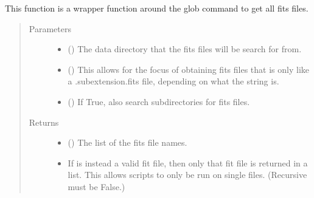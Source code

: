 \documentclass[letterpaper,10pt,english]{sphinxmanual}
\begin{document}
\begin{fulllineitems}
\label{\detokenize{docstrings/ifa_smeargle.core.io:ifa_smeargle.core.io.get_fits_filenames}}
This function is a wrapper function around the glob command
to get all fits files.
\begin{quote}\begin{description}
\item[{Parameters}] \leavevmode\begin{itemize}
\item {} 
 () \textendash{} The data directory that the fits files will be search for
from.

\item {} 
 (\sphinxstyleliteralemphasis{\sphinxupquote{ (}}\sphinxstyleliteralemphasis{\sphinxupquote{)}}) \textendash{} This allows for the focus of obtaining fits files that
is only like a .subextension.fits file, depending on what
the string  is.

\item {} 
 (\sphinxstyleliteralemphasis{\sphinxupquote{ (}}\sphinxstyleliteralemphasis{\sphinxupquote{)}}) \textendash{} If True, also search subdirectories for fits files.

\end{itemize}

\item[{Returns}] \leavevmode
\begin{itemize}
\item {} 
 () \textendash{} The list of the fits file names.

\item {} 
 \textendash{} If  is instead a valid fit file, then only
that fit file is returned in a list. This allows scripts to
only be run on single files. (Recursive must be False.)

\end{itemize}


\end{description}\end{quote}

\end{fulllineitems}
\end{document}
